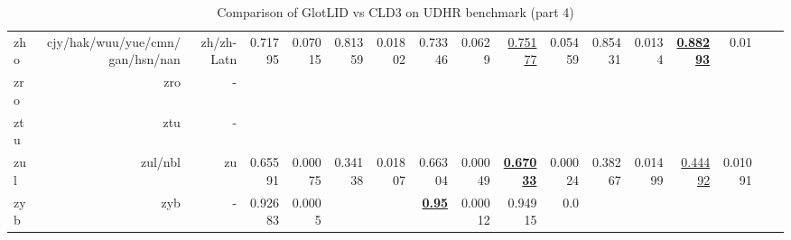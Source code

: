 \documentclass[11pt]{article}
\def\udhr{UDHR\xspace}
\begin{document}
\begin{table*}[h]
{\begin{tabular}{lrrrrrrrrrrrrrrrr}
zho         & cjy/hak/wuu/yue/cmn/gan/hsn/nan         & zh/zh-Latn         & 0.71795         & 0.07015         & 0.81359         & 0.01802         & 0.73346         & 0.0629         & \underline{0.75177}         & 0.05459         & 0.85431         & 0.0134         & \textbf{\underline{0.88293}}         & 0.01         \\
zro         & zro         & -         &          &          &          &          &          &          &          &          &          &          &          &          \\
ztu         & ztu         & -         &          &          &          &          &          &          &          &          &          &          &          &          \\
zul         & zul/nbl         & zu         & 0.65591         & 0.00075         & 0.34138         & 0.01807         & 0.66304         & 0.00049         & \textbf{\underline{0.67033}}         & 0.00024         & 0.38267         & 0.01499         & \underline{0.44492}         & 0.01091         \\
zyb         & zyb         & -         & 0.92683         & 0.0005         &          &          & \textbf{\underline{0.95}}         & 0.00012         & 0.94915         & 0.0         &          &          &          &          \\
\end{tabular}
}
\caption{Comparison of GlotLID vs CLD3 on \udhr benchmark (part 4)}
\label{tab:appendix_glotlid_cld3_udhr_4}
\end{table*}
 
\end{document}
